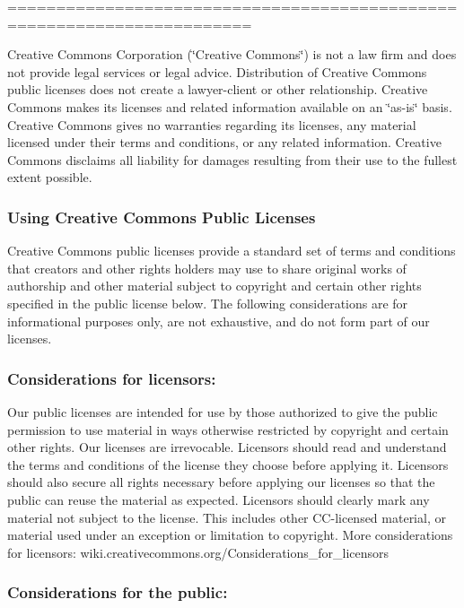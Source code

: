 =======================================================================

Creative Commons Corporation (\char`\"{}\+Creative Commons\char`\"{}) is not a law firm and does not provide legal services or legal advice. Distribution of Creative Commons public licenses does not create a lawyer-\/client or other relationship. Creative Commons makes its licenses and related information available on an \char`\"{}as-\/is\char`\"{} basis. Creative Commons gives no warranties regarding its licenses, any material licensed under their terms and conditions, or any related information. Creative Commons disclaims all liability for damages resulting from their use to the fullest extent possible.

\subsubsection*{Using Creative Commons Public Licenses}

Creative Commons public licenses provide a standard set of terms and conditions that creators and other rights holders may use to share original works of authorship and other material subject to copyright and certain other rights specified in the public license below. The following considerations are for informational purposes only, are not exhaustive, and do not form part of our licenses.

\subsubsection*{Considerations for licensors\+:}

Our public licenses are intended for use by those authorized to give the public permission to use material in ways otherwise restricted by copyright and certain other rights. Our licenses are irrevocable. Licensors should read and understand the terms and conditions of the license they choose before applying it. Licensors should also secure all rights necessary before applying our licenses so that the public can reuse the material as expected. Licensors should clearly mark any material not subject to the license. This includes other C\+C-\/licensed material, or material used under an exception or limitation to copyright. More considerations for licensors\+: wiki.\+creativecommons.\+org/\+Considerations\+\_\+for\+\_\+licensors

\subsubsection*{Considerations for the public\+:}


